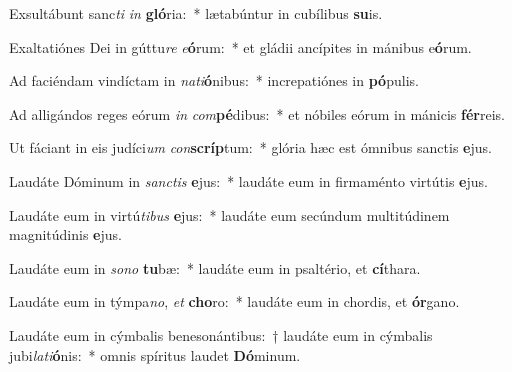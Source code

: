 \item Exsultábunt sanc\textit{ti} \textit{in} \textbf{gló}ria:~* lætabúntur in cubílibus \textbf{su}is.
\item Exaltatiónes Dei in gúttu\textit{re} \textit{e}\textbf{ó}rum:~* et gládii ancípites in mánibus e\textbf{ó}rum.
\item Ad faciéndam vindíctam in \textit{na}\textit{ti}\textbf{ó}nibus:~* increpatiónes in \textbf{pó}pulis.
\item Ad alligándos reges eórum \textit{in} \textit{com}\textbf{pé}dibus:~* et nóbiles eórum in mánicis \textbf{fér}reis.
\item Ut fáciant in eis judíci\textit{um} \textit{con}\textbf{scríp}tum:~* glória hæc est ómnibus sanctis \textbf{e}jus.
\item Laudáte Dóminum in \textit{sanc}\textit{tis} \textbf{e}jus:~* laudáte eum in firmaménto virtútis \textbf{e}jus.
\item Laudáte eum in virtú\textit{ti}\textit{bus} \textbf{e}jus:~* laudáte eum secúndum multitúdinem magnitúdinis \textbf{e}jus.
\item Laudáte eum in \textit{so}\textit{no} \textbf{tu}bæ:~* laudáte eum in psaltério, et \textbf{cí}thara.
\item Laudáte eum in týmpa\textit{no}, \textit{et} \textbf{cho}ro:~* laudáte eum in chordis, et \textbf{ór}gano.
\item Laudáte eum in cýmbalis benesonántibus:~† laudáte eum in cýmbalis jubi\textit{la}\textit{ti}\textbf{ó}nis:~* omnis spíritus laudet \textbf{Dó}minum.
